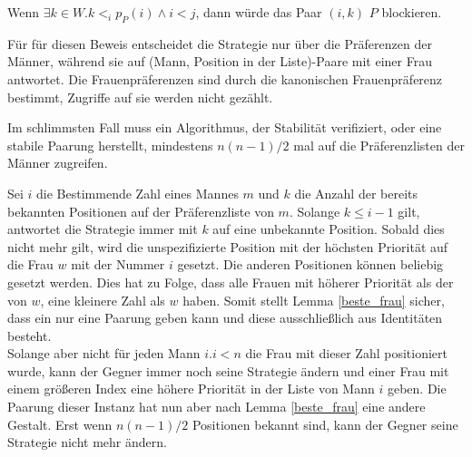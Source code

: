 \begin{Beweis}
\label{beste_frau_bew}
  Wenn $\exists k \in W.k <_{i}p_{P}(i)\land i < j$, dann würde das Paar $(i,k)$ $P$ blockieren.
\end{Beweis}

Für für diesen Beweis entscheidet die Strategie nur über die Präferenzen der Männer, während sie auf (Mann, Position in der Liste)-Paare mit einer Frau antwortet. Die Frauenpräferenzen sind durch die kanonischen Frauenpräferenz bestimmt, Zugriffe auf sie werden nicht gezählt.

\begin{Theorem}
\label{keine_gute_loesung}
  Im schlimmsten Fall muss ein Algorithmus, der Stabilität verifiziert, oder eine stabile Paarung herstellt, mindestens $n(n-1)/2$ mal auf die Präferenzlisten der Männer zugreifen.
\end{Theorem}

\begin{Beweis}
\label{keine_gute_loesung_bew}
  Sei $i$ die Bestimmende Zahl eines Mannes $m$ und $k$ die Anzahl der bereits bekannten Positionen auf der Präferenzliste von $m$. Solange $k \leq i-1$ gilt, antwortet die Strategie immer mit $k$ auf eine unbekannte Position. Sobald dies nicht mehr gilt, wird die unspezifizierte Position mit der höchsten Priorität auf die Frau $w$ mit der Nummer $i$ gesetzt. Die anderen Positionen können beliebig gesetzt werden. Dies hat zu Folge, dass alle Frauen mit höherer Priorität als der von $w$, eine kleinere Zahl als $w$ haben. Somit stellt Lemma \ref{beste_frau} sicher, dass ein nur eine Paarung geben kann und diese ausschließlich aus Identitäten besteht.\\
  Solange aber nicht für jeden Mann $i. i < n$ die Frau mit dieser Zahl positioniert wurde, kann der Gegner immer noch seine Strategie ändern und einer Frau mit einem größeren Index eine höhere Priorität in der Liste von Mann $i$ geben. Die Paarung dieser Instanz hat nun aber nach Lemma \ref{beste_frau} eine andere Gestalt. Erst wenn $n(n-1)/2$ Positionen bekannt sind, kann der Gegner seine Strategie nicht mehr ändern.

\end{Beweis}

